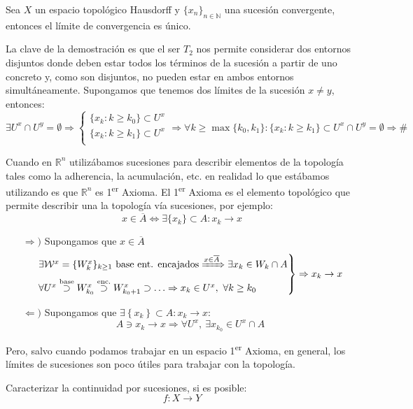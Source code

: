 \begin{prop}
Sea $X$ un espacio topológico Hausdorff y $\{x_n\}_{n\in \mathbb{N}}$ una sucesión convergente, entonces el límite de convergencia es único.
\end{prop}
\begin{demo}
La clave de la demostración es que el ser $T_2$ nos permite considerar dos entornos disjuntos donde deben estar todos los términos de la sucesión a partir de uno concreto y, como son disjuntos, no pueden estar en ambos entornos simultáneamente. Supongamos que tenemos dos límites de la sucesión $x\neq y$, entonces:
\[
\exists U^x \cap U^y = \emptyset \Rightarrow \begin{cases}
\{x_k : k \ge k_0\} \subset U^x \\
\{x_k : k \ge k_1\} \subset U^x \\
\end{cases}
\Rightarrow \forall k \geq \max\{k_0,k_1\} : \{x_k : k \ge k_1\} \subset U^x \cap U^y = \emptyset \Rightarrow \#
\]
\end{demo}

\begin{obs}
Cuando en $\mathbb{R}^n$ utilizábamos sucesiones para describir elementos de la topología tales como la adherencia, la acumulación, etc. en realidad lo que estábamos utilizando es que $\mathbb{R}^n$ es 1\textsuperscript{er} Axioma. El 1\textsuperscript{er} Axioma es el elemento topológico que permite describir una la topología vía sucesiones, por ejemplo:
    \[
     x \in \overline{A} \Leftrightarrow \exists \{x_k\} \subset A: x_k \rightarrow x
    \]
    \begin{itemize}
        \item[$\Rightarrow)$] Supongamos que $x \in \overline{A}$
        \[
        \begin{rcases}
            \exists \mathcal{W}^x = \{W_k^x\}_{k \ge 1} \text{ base ent. encajados} \xRightarrow{x \in \overline{A}} \exists x_k \in W_k \cap A\\
            \forall U^x \stackrel{\text{base}}{\supset} W_{k_0}^x \stackrel{\text{enc.}}{\supset} W_{k_0 + 1}^x \supset \ldots \Rightarrow x_k \in U^x,\ \forall k \ge k_0  
        \end{rcases} \Rightarrow x_k \rightarrow x
        \]
        \item[$\Leftarrow)$] Supongamos que $\exists \left\{ x_k \right\} \subset A: x_k \rightarrow x$:
        \[
        A \ni x_k \rightarrow x \Rightarrow \forall U^x,\ \exists x_{k_0} \in U^x \cap A
        \]
    \end{itemize}
Pero, salvo cuando podamos trabajar en un espacio 1\textsuperscript{er} Axioma, en general, los límites de sucesiones son poco útiles para trabajar con la topología.
\end{obs}

\begin{enun}
Caracterizar la continuidad por sucesiones, si es posible:
\[
f: X \rightarrow Y
\]
\end{enun}

